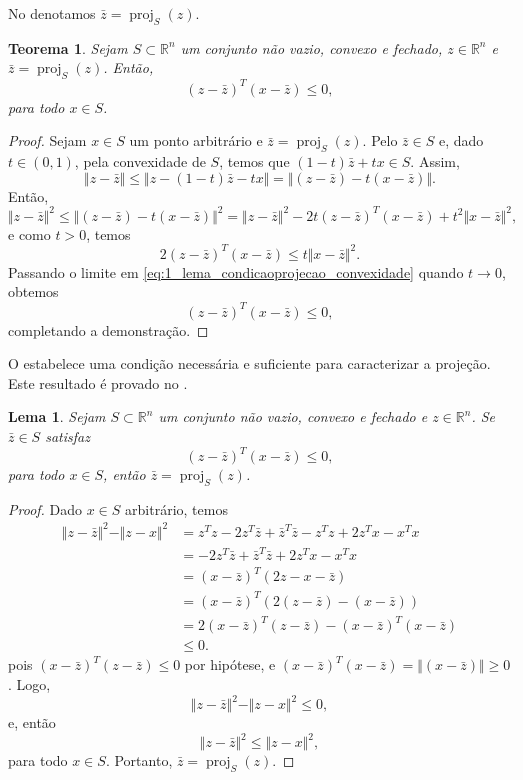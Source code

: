 \documentclass[12pt,a4paper]{scrartcl}
\DeclareMathOperator{\proj}{proj}
\def\RR{\mathds{R}}
\newtheorem{teo}{Teorema}
\newtheorem{lema}{Lema}
\theoremstyle{definition}%
\begin{document}
No  denotamos $\bar{z} = \proj_{S} (z)$.


\begin{teo}  \label{lema_condicaoprojecao_convexidade}
Sejam $S \subset \RR^{n}$ um conjunto não vazio, convexo e fechado, $z \in \RR^{n}$ e $\bar{z} = \proj_{S} (z)$. Então, 
\[
(z - \bar{z})^{T}(x - \bar{z}) \leq 0 ,
\]
para todo $x \in S$.
\end{teo}
\begin{proof}
Sejam $x \in S$ um ponto arbitrário e $\bar{z} = \proj_{S} (z)$. Pelo  $\bar{z} \in S$ e, dado $t \in (0,1)$, pela convexidade de $S$, temos que $(1-t)\bar{z} + tx \in S$. Assim, 
\[
\Vert z-\bar{z} \Vert \leq \Vert z-(1-t)\bar{z} - tx \Vert = \Vert (z-\bar{z}) - t(x-\bar{z}) \Vert.
\]
Então, 
\[
\Vert z-\bar{z} \Vert^{2} \leq \Vert (z-\bar{z}) - t(x-\bar{z}) \Vert^{2} = \Vert z-\bar{z} \Vert^{2} - 2t(z-\bar{z})^{T}(x-\bar{z}) + t^{2}\Vert x- \bar{z} \Vert^{2} ,
\]
e como $t>0$, temos
\[ \label{eq:1_lema_condicaoprojecao_convexidade}
2(z-\bar{z})^{T}(x-\bar{z}) \leq t \Vert x- \bar{z} \Vert^{2} .
\]
Passando o limite em \eqref{eq:1_lema_condicaoprojecao_convexidade} quando $t\rightarrow 0$, obtemos
\[
(z-\bar{z})^{T}(x-\bar{z}) \leq 0, 
\]
completando a demonstração.
\end{proof}


O  estabelece uma condição necessária e suficiente para caracterizar a projeção. Este resultado é provado no .


\begin{lema} \label{lema:defineprojecao_convexidade}
Sejam $S \subset \RR^{n}$ um conjunto não vazio, convexo e fechado e $z \in \RR^{n}$. Se $\bar{z} \in S$ satisfaz
\[
(z - \bar{z})^{T}(x - \bar{z}) \leq 0 ,
\]
para todo $x \in S$, então $\bar{z} = \proj_{S} (z)$.
\end{lema}
\begin{proof}
Dado $x\in S$ arbitrário, temos
\begin{align}
\Vert z-\bar{z} \Vert^{2} - \Vert z-x \Vert^{2} & = z^{T}z - 2z^{T}\bar{z} + \bar{z}^{T}\bar{z} - z^{T}z + 2z^{T}x - x^{T}x \\
& = - 2z^{T}\bar{z} + \bar{z}^{T}\bar{z} + 2z^{T}x - x^{T}x \\
& = (x-\bar{z})^{T}(2z-x-\bar{z}) \\
& = (x-\bar{z})^{T}(2(z-\bar{z})-(x-\bar{z})) \\
& = 2(x-\bar{z})^{T}(z-\bar{z}) - (x-\bar{z})^{T}(x-\bar{z}) \\
& \leq 0 .
\end{align}
pois $(x-\bar{z})^{T}(z-\bar{z}) \leq 0$ por hipótese, e $(x-\bar{z})^{T}(x-\bar{z}) = \Vert (x-\bar{z}) \Vert \geq 0$.
Logo,
\[
\Vert z-\bar{z} \Vert^{2} - \Vert z-x \Vert^{2} \leq 0,
\]
e, então
\[
\Vert z-\bar{z} \Vert^{2} \leq \Vert z-x \Vert^{2} ,
\]
para todo $x\in S$. Portanto, $\bar{z} = \proj_{S} (z)$.
\end{proof}
\end{document}
